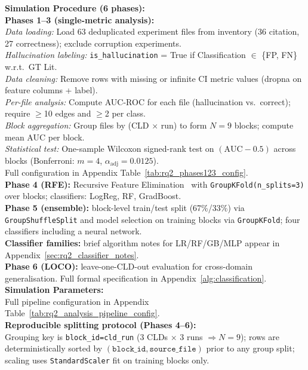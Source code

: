 \noindent\textbf{Simulation Procedure (6 phases):}\\
\textbf{Phases 1--3 (single-metric analysis):}\\
\textit{Data loading:} Load 63 deduplicated experiment files from inventory (36 citation, 27 correctness); exclude corruption experiments.\\
\textit{Hallucination labeling:} \texttt{is\_hallucination} = True if Classification $\in$ \{FP, FN\} w.r.t.\ GT Lit.\\
\textit{Data cleaning:} Remove rows with missing or infinite CI metric values (dropna on feature columns + label).\\
\textit{Per-file analysis:} Compute AUC-ROC for each file (hallucination vs.\ correct); require $\geq$10 edges and $\geq$2 per class.\\
\textit{Block aggregation:} Group files by (CLD $\times$ run) to form $N{=}9$ blocks; compute mean AUC per block.\\
\textit{Statistical test:} One-sample Wilcoxon signed-rank test on $(\mathrm{AUC}-0.5)$ across blocks (Bonferroni: $m{=}4$, $\alpha_{\text{adj}}{=}0.0125$).\\
Full configuration in Appendix Table~\ref{tab:rq2_phases123_config}.\\
\textbf{Phase 4 (RFE):} Recursive Feature Elimination~\cite{pedregosa2011sklearn} with \texttt{GroupKFold(n\_splits=3)} over blocks; classifiers: LogReg, RF, GradBoost.\\
\textbf{Phase 5 (ensemble):} block-level train/test split (67\%/33\%) via \texttt{GroupShuffleSplit} and model selection on training blocks via \texttt{GroupKFold}; four classifiers including a neural network.\\
\textbf{Classifier families:} brief algorithm notes for LR/RF/GB/MLP appear in Appendix~\ref{sec:rq2_classifier_notes}.\\
\textbf{Phase 6 (LOCO):} leave-one-CLD-out evaluation for cross-domain generalisation. Full formal specification in Appendix~\ref{alg:classification}.\\
\textbf{Simulation Parameters:}\\
Full pipeline configuration in Appendix Table~\ref{tab:rq2_analysis_pipeline_config}.\\
\textbf{Reproducible splitting protocol (Phases 4--6):}\\
Grouping key is \texttt{block\_id=cld\_run} (3 CLDs $\times$ 3 runs $\Rightarrow N{=}9$); rows are deterministically sorted by \((\texttt{block\_id}, \texttt{source\_file})\) prior to any group split; scaling uses \texttt{StandardScaler} fit on training blocks only.\\
